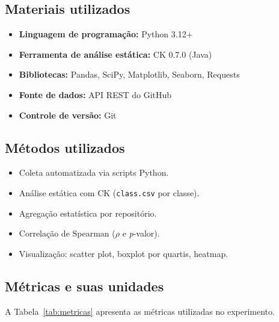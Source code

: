 \documentclass[12pt,a4paper]{article}
\begin{document}
\subsection{Materiais utilizados}

\begin{itemize}
    \item \textbf{Linguagem de programação:} Python 3.12+
    \item \textbf{Ferramenta de análise estática:} CK 0.7.0 (Java)
    \item \textbf{Bibliotecas:} Pandas, SciPy, Matplotlib, Seaborn, Requests
    \item \textbf{Fonte de dados:} API REST do GitHub
    \item \textbf{Controle de versão:} Git
\end{itemize}

\subsection{Métodos utilizados}

\begin{itemize}
    \item Coleta automatizada via scripts Python.
    \item Análise estática com CK (\texttt{class.csv} por classe).
    \item Agregação estatística por repositório.
    \item Correlação de Spearman ($\rho$ e \textit{p}-valor).
    \item Visualização: scatter plot, boxplot por quartis, heatmap.
\end{itemize}

\subsection{Métricas e suas unidades}

A Tabela~\ref{tab:metricas} apresenta as métricas utilizadas no experimento.
\end{document}
